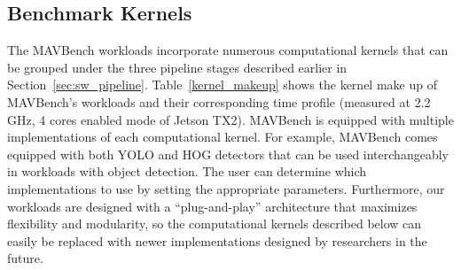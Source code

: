 \subsection{Benchmark Kernels} \label{sec:kernels}

The MAVBench workloads incorporate numerous computational kernels that can be grouped under the three pipeline stages described earlier in Section~\ref{sec:sw_pipeline}. Table~\ref{kernel_makeup} shows the kernel make up of MAVBench's workloads and their corresponding time profile (measured at 2.2 GHz, 4 cores enabled mode of Jetson TX2). MAVBench is equipped with multiple implementations of each computational kernel. For example, MAVBench comes equipped with both YOLO and HOG detectors that can be used interchangeably in workloads with object detection. The user can determine which implementations to use by setting the appropriate parameters. Furthermore, our workloads are designed with a ``plug-and-play'' architecture that maximizes flexibility and modularity, so the computational kernels described below can easily be replaced with newer implementations designed by researchers in the future.

